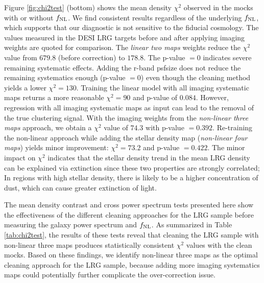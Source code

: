  Figure \ref{fig:chi2test} (bottom) shows the mean density $\chi^{2}$ observed in the mocks with or without $f_{\rm NL}$. We find consistent results regardless of the underlying $f_{\rm NL}$, which supports that our diagnostic is not sensitive to the fiducial cosmology. The values measured in the DESI LRG targets before and after applying imaging weights are quoted for comparison. The \textit{linear two maps} weights reduce the $\chi^{2}$ value from $679.8$ (before correction) to $178.8$. The p-value $=0$ indicates severe remaining systematic effects. Adding the r-band psfsize does not reduce the remaining systematics enough (p-value $=0$) even though the cleaning method yields a lower $\chi^{2}=130$. Training the linear model with all imaging systematic maps returns a more reasonable $\chi^{2}=90$ and p-value of $0.084$. However, regression with all imaging systematic maps as input can lead to the removal of the true clustering signal. With the imaging weights from the \textit{non-linear three maps} approach, we obtain a $\chi^{2}$ value of $74.3$ with p-value $=0.392$. Re-training the non-linear approach while adding the stellar density map (\textit{non-linear four maps}) yields minor improvement: $\chi^{2}=73.2$ and p-value $=0.422$. The minor impact on $\chi^{2}$ indicates that the stellar density trend in the mean LRG density can be explained via extinction since these two properties are strongly correlated; In regions with high stellar density, there is likely to be a higher concentration of dust, which can cause greater extinction of light.

 The mean density contrast and cross power spectrum tests presented here show the effectiveness of the different cleaning approaches for the LRG sample before measuring the galaxy power spectrum and $f_{\rm NL}$. As summarized in Table \ref{tab:chi2test}, the results of these tests reveal that cleaning the LRG sample with non-linear three maps produces statistically consistent $\chi^{2}$ values with the clean mocks. Based on these findings, we identify non-linear three maps as the optimal cleaning approach for the LRG sample, because adding more imaging systematics maps could potentially further complicate the over-correction issue.

